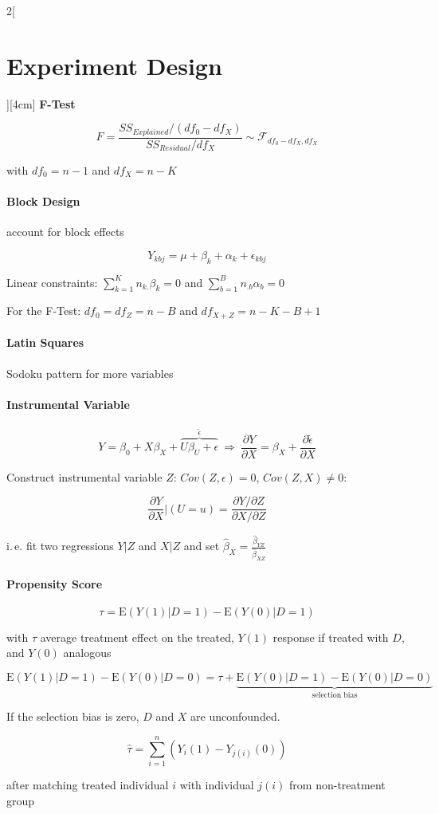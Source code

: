 \documentclass[8pt]{extarticle}
\begin{document}
\begin{multicols}{2}[\section{Experiment Design}][4cm]
\textbf{F-Test}

$$F=\frac{SS_{Explained}/(df_0 {-} df_X)}{SS_{Residual}/df_X} \sim \mathcal{F}_{df_0{-}df_X,df_X}$$

with $df_0 = n{-}1$ and $df_X=n{-}K$


\paragraph{Block Design} account for block effects

$$Y_{kbj} = \mu+ \beta_k +\alpha_k+\epsilon_{kbj}$$

\noindent Linear constraints: $\sum_{k=1}^K n_{k.} \beta_k = 0$ and $\sum_{b=1}^B n_{.b} \alpha_b = 0$ 

For the F-Test: $df_0 = df_Z = n{-}B$ and $df_{X+Z}=n{-}K{-}B{+}1$

\paragraph{Latin Squares} Sodoku pattern for more variables

\paragraph{Instrumental Variable}

$$Y = \beta_0 + X\beta_X + \overbrace{U\beta_U + \epsilon}^{\tilde{\epsilon}} \ \Rightarrow\  \frac{\partial Y}{\partial X} = \beta_X + \frac{\partial \tilde{\epsilon}}{\partial X}$$

\noindent Construct instrumental variable $Z$: $Cov(Z,\epsilon){=}0$, $Cov(Z,X){\neq}0$:

$$\frac{\partial Y}{\partial X}|(U{=}u) = \frac{\partial Y / \partial Z}{\partial X/ \partial Z}$$

i.\,e. fit two regressions $Y|Z$ and $X|Z$ and set $\hat{\beta}_X = \frac{\hat{\beta}_{YZ}}{\hat{\beta}_{XZ}}$

\paragraph{Propensity Score} 

$$\tau = \mathrm{E}(Y(1)|D{=}1) - \mathrm{E}(Y(0)|D{=}1)$$

\noindent with $\tau$ average treatment effect on the treated, $Y(1)$ response if treated with $D$, and $Y(0)$ analogous

$$\mathrm{E}(Y(1)|D{=}1) - \mathrm{E}(Y(0)|D{=}0) = \tau + \underbrace{\mathrm{E}(Y(0)|D{=}1) - \mathrm{E}(Y(0)|D{=}0)}_{\text{selection bias}}$$

If the selection bias is zero, $D$ and $X$ are unconfounded.

$$\hat{\tau} = \sum_{i=1}^n (Y_i(1) -Y_{j(i)}(0))$$

\noindent after matching treated individual $i$ with individual $j(i)$ from non-treatment group




\end{multicols}
\end{document}
